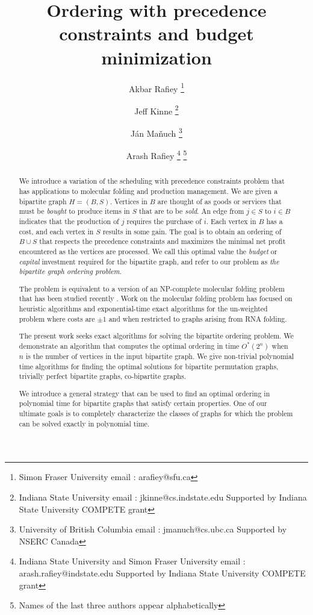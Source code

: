 \documentclass[letterpaper,11pt,abstracton]{scrartcl}
\begin{document}
\title{Ordering with precedence constraints and budget minimization}


\author{Akbar Rafiey \thanks{Simon Fraser University email : arafiey@sfu.ca} \and 
Jeff Kinne \thanks{Indiana State University email : jkinne@cs.indstate.edu Supported by Indiana State University COMPETE grant} \and
J\'an Ma\v nuch \thanks{University of British Columbia email : jmanuch@cs.ubc.ca  Supported by NSERC Canada} \and
Arash Rafiey \thanks{Indiana State University and Simon Fraser University email :  
arash.rafiey@indstate.edu Supported by Indiana State University COMPETE grant} \footnote{Names of the last three authors appear alphabetically}
}


\date{}
\maketitle




\begin{abstract}
We introduce a variation of the scheduling with precedence
constraints problem that has applications to molecular folding and
production management. We are given a bipartite graph
$H=(B,S)$.  Vertices in $B$ are thought of as goods or services that must be
\emph{bought} to produce items in $S$ that are to be \emph{sold}.  An
edge from $j\in S$ to $i\in B$ indicates that the production of
$j$ requires the purchase of $i$.  Each vertex in $B$ has a cost, and
each vertex in $S$ results in some gain.  The goal
is to obtain an ordering of $B\cup S$ that respects the precedence
constraints and maximizes the minimal net profit encountered as the vertices
are processed.  We call this optimal value the \emph{budget} or
\emph{capital} investment required for the bipartite graph, and refer to our
problem as \emph{the bipartite graph ordering problem}.

The problem is equivalent to a version of an NP-complete molecular folding problem
that has been studied recently \cite{MTSC09}. Work on
the molecular folding problem has focused on heuristic algorithms and
exponential-time exact algorithms for the un-weighted problem where costs
are $\pm 1$ and when restricted to graphs arising from RNA folding.

The present work seeks exact algorithms for solving the bipartite
ordering problem.  We demonstrate an algorithm that computes
the optimal ordering in time $O^*(2^n)$ when $n$ is the number of vertices
in the input bipartite graph. We give non-trivial polynomial time algorithms for finding
the optimal solutions for bipartite permutation graphs, trivially perfect bipartite graphs, co-bipartite graphs.

We introduce a general strategy that can
be used to find an optimal ordering in polynomial time for bipartite graphs
that satisfy certain properties. One of our ultimate goals is to completely characterize
the classes of graphs for which the problem can be solved exactly
in polynomial time.




\end{abstract}
\end{document}
